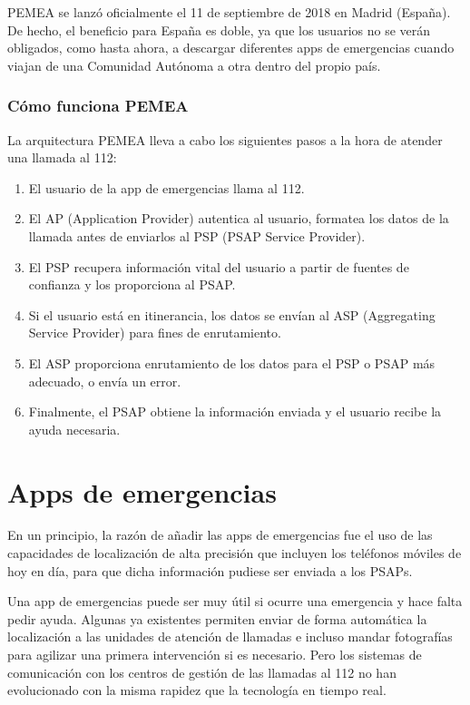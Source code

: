 PEMEA se lanzó oficialmente el 11 de septiembre de 2018 en Madrid (España). De hecho, el beneficio para España es doble, ya que los usuarios no se verán obligados, como hasta ahora, a descargar diferentes apps de emergencias cuando viajan de una Comunidad Autónoma a otra dentro del propio país.

\subsubsection{Cómo funciona PEMEA}

La arquitectura PEMEA lleva a cabo los siguientes pasos a la hora de atender una llamada al 112:

\begin{enumerate}
  \item El usuario de la app de emergencias llama al 112.
  \item El AP (Application Provider) autentica al usuario, formatea los datos de la llamada antes de enviarlos al PSP (PSAP Service Provider).
  \item El PSP recupera información vital del usuario a partir de fuentes de confianza y los proporciona al PSAP.
  \item Si el usuario está en itinerancia, los datos se envían al ASP (Aggregating Service Provider) para fines de enrutamiento.
  \item El ASP proporciona enrutamiento de los datos para el PSP o PSAP más adecuado, o envía un error.
  \item Finalmente, el PSAP obtiene la información enviada y el usuario recibe la ayuda necesaria.
\end{enumerate}

\section{Apps de emergencias}

En un principio, la razón de añadir las apps de emergencias fue el uso de las capacidades de localización de alta precisión que incluyen los teléfonos móviles de hoy en día, para que dicha información pudiese ser enviada a los PSAPs.

Una app de emergencias puede ser muy útil si ocurre una emergencia y hace falta pedir ayuda. Algunas ya existentes permiten enviar de forma automática la localización a las unidades de atención de llamadas e incluso mandar fotografías para agilizar una primera intervención si es necesario. Pero los sistemas de comunicación con los centros de gestión de las llamadas al 112 no han evolucionado con la misma rapidez que la tecnología en tiempo real.

